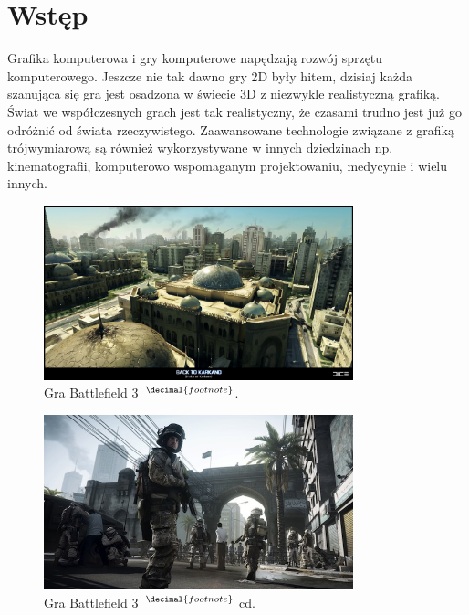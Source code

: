 \section{Wstęp}
Grafika komputerowa i gry komputerowe napędzają rozwój sprzętu
komputerowego. Jeszcze nie tak dawno gry 2D były hitem, dzisiaj każda szanująca
się gra jest osadzona w świecie 3D z niezwykle realistyczną grafiką. Świat we
współczesnych grach jest tak realistyczny, że czasami trudno jest już go
odróżnić od świata rzeczywistego. Zaawansowane technologie związane z grafiką
trójwymiarową są również wykorzystywane w innych dziedzinach np. kinematografii,
komputerowo wspomaganym projektowaniu, medycynie i wielu innych.

{
\addtocounter{footnote}{1}
\begin{figure}[h!]
  \centering
  \includegraphics[width=0.8\textwidth]{images/bf3_1.jpg}
  \caption[Gra Battlefield 3]{Gra Battlefield 3~$^{\decimal{footnote}}$.}
\end{figure}
\begin{figure}[h!]
  \centering
  \includegraphics[width=0.8\textwidth]{images/bf3_2.jpg}
  \caption[Gra Battlefield 3 cd.]{Gra Battlefield 3~$^{\decimal{footnote}}$ cd.}
\end{figure}
}
